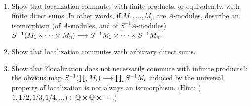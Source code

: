\begin{exr}\label{chap1exr:localization_commutes}\ 
\begin{enumerate}[label=(\alph*)]
\item Show that localization commutes with finite products, or equivalently, with
finite direct sums. In other words, if $M_1,...,M_n$ are $A$-modules, describe an isomorphism (of $A$-modules, and of $S^{-1}A$-modules) $S^{-1}(M_1 \times\cdot\cdot\cdot\times M_n) \longrightarrow S^{-1}M_1 \times
\cdot\cdot \cdot\times S^{-1}M_n$.
\item  Show that localization commutes with arbitrary direct sums.
\item Show that ?localization does not necessarily commute with infinite products?:
the obvious map $S^{-1}(\prod_i M_i) \longrightarrow  \prod_i S^{-1}M_i$ induced by the universal property of
localization is not always an isomorphism. (Hint: ($1, 1/2, 1/3, 1/4,... ) \in \mathbb Q\times\mathbb Q \times \cdot\cdot\cdot$.)
\end{enumerate}
\end{exr}
